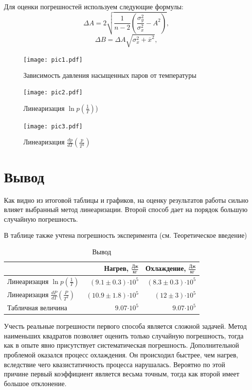\documentclass[12pt,a4paper]{article}
\newcommand{\e}[1]{\text{$\cdot10^{#1}$}}
\begin{document}
\newpage
	Для оценки погрешностей используем следующие формулы:
	$$\Delta A =  2 \sqrt{\frac{1}{n-2} \left( \frac{\sigma_y^2}{\sigma_x^2} - A^2 \right)},$$
	$$\Delta B = \Delta A \sqrt{\sigma_x^2 + \overline{x}^2},$$

	\begin{figure}[H]
		\texttt{[image: pic1.pdf]}
		\caption{Зависимость давления насыщенных паров от температуры}
	\end{figure}

	\begin{figure}[H]
		\texttt{[image: pic2.pdf]}
		\caption{Линеаризация $\ln p (\frac{1}{T})$)}
	\end{figure}
	
	\begin{figure}[H]
		\texttt{[image: pic3.pdf]}
		\caption{Линеаризация $\frac{dp}{dT} (\frac{p}{T^2})$}
	\end{figure}
	
\section*{Вывод}

	Как видно из итоговой таблицы и графиков, на оценку результатов работы сильно влияет выбранный метод линеаризации. Второй способ дает на порядок большую случайную погрешность. 
	
	В таблице также учтена погрешность эксперимента (см. Теоретическое введение)
	
	\begin{table}[H]
		\caption{Вывод}
		\label{tab:itog}
		\centering
		\footnotesize
		\begin{tabular}{l|r|r}
			\toprule
			$ $ & Нагрев, $\frac{\text{Дж}}{\text{кг}}$& Охлаждение, $\frac{\text{Дж}}{\text{кг}}$ \\ \midrule
			Линеаризация $\ln{p}(\frac{1}{T})$          & $(9.1 \pm 0.3)\e{5}$ & $(8.3 \pm 0.3)\e{5}$  \\ \midrule 
			Линеаризация $\frac{dP}{dT}(\frac{P}{T^2})$ & $(10.9 \pm 1.8)\e{5}$ & $(12 \pm 3)\e{5} $  \\ \midrule
			Табличная величина 							& $9.07\e{5} $ & $9.07\e{5} $  \\ 
			\bottomrule
		\end{tabular}
	\end{table}

	Учесть реальные погрешности первого способа является сложной задачей. Метод наименьших квадратов позволяет оценить только случайную погрешность, тогда как в опыте явно присутствует систематическая погрешность. Дополнительной проблемой оказался процесс охлаждения. Он происходил быстрее, чем нагрев, вследствие чего квазистатичность процесса нарушалась. Вероятно по этой причине первый коэффициент является весьма точным, тогда как второй имеет большое отклонение.
	
\end{document}
